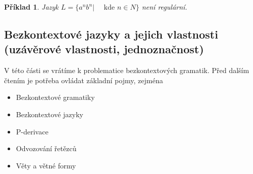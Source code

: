 \documentclass[10pt,a4paper]{article}
\theoremstyle{note}
\newtheorem{priklad}{Příklad}
\begin{document}
\begin{priklad}\label{priklad-reg}
 Jazyk $L = \lbrace a^{n}b^{n} | \quad \text{ kde } n \in N \rbrace$ není regulární.
\end{priklad}


	\subsection{Bezkontextové jazyky a jejich vlastnosti (uzávěrové vlastnosti, jednoznačnost)}

V této části se vrátíme k problematice bezkontextových gramatik. Před dalším čtením je potřeba ovládat základní pojmy, zejména
\begin{itemize}

\item
Bezkontextové gramatiky
\item
Bezkontextové jazyky
\item
P-derivace
\item
Odvozování řetězců
\item
Věty a větné formy

\end{itemize}
\end{document}
